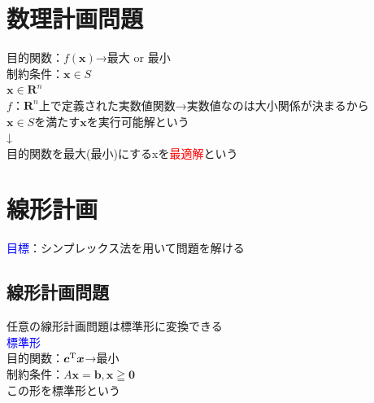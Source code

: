 \documentclass{jsarticle}
\begin{document}
{{\section{数理計画問題}
目的関数：$f(\bm{x})$→最大 or 最小 \\
制約条件：$\bm{x}∈S $\\
$\bm{x}∈\bm{R}^n$ \\
$f$：$\bm{R}^n$上で定義された実数値関数→実数値なのは大小関係が決まるから\\
$\bm{x}\in S$を満たす$\bm{x}$を実行可能解という\\
↓\\
目的関数を最大(最小)にするxを{\textcolor{red}{最適解}}という
\section{線形計画}
{\textcolor{blue}{目標}}：シンプレックス法を用いて問題を解ける
	\subsection{線形計画問題}
		任意の線形計画問題は標準形に変換できる\\
		{\textcolor{blue}{標準形}}\\
		目的関数：$\bm{c}^{\rm{T}}\bm{x}$→最小\\
		制約条件：$A\bm{x}=\bm{b},\bm{x}≧\bm{0}$\\
		この形を{\Large{標準形}}という\\
}}
\end{document}
